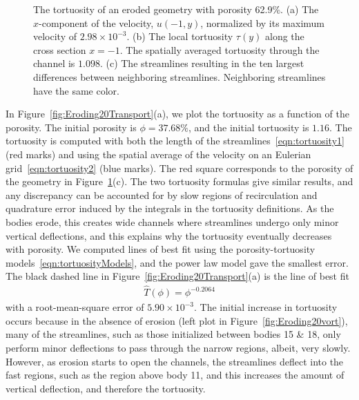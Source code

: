 \documentclass[preprint,10pt]{elsarticle}
\begin{document}
\begin{figure}[H]
\begin{subfigure}[b]{0.5\textwidth}
\caption{}
\end{subfigure}
\caption{\label{fig:Eroding20tort} The tortuosity of an eroded geometry
with porosity 62.9\%. (a) The $x$-component of the velocity, $u(-1,y)$,
normalized by its maximum velocity of $2.98 \times 10^{-3}$. (b) The
local tortuosity $\tau(y)$ along the cross section $x = -1$.  The
spatially averaged tortuosity through the channel is $1.098$.  (c) The
streamlines resulting in the ten largest differences between neighboring
streamlines.  Neighboring streamlines have the same color.}
\end{figure}

In Figure~\ref{fig:Eroding20Transport}(a), we plot the tortuosity as a
function of the porosity. The initial porosity is $\phi = 37.68\%$, and
the initial tortuosity is $1.16$.  The tortuosity is computed with both
the length of the streamlines~\eqref{eqn:tortuosity1} (red marks) and
using the spatial average of the velocity on an Eulerian
grid~\eqref{eqn:tortuosity2} (blue marks).  The red square corresponds
to the porosity of the geometry in Figure~\ref{fig:Eroding20tort}(c).
The two tortuosity formulas give similar results, and any discrepancy
can be accounted for by slow regions of recirculation and quadrature
error induced by the integrals in the tortuosity definitions.  As the
bodies erode, this creates wide channels where streamlines undergo only
minor vertical deflections, and this explains why the tortuosity
eventually decreases with porosity.  We computed lines of best fit using
the porosity-tortuosity models~\eqref{eqn:tortuosityModels}, and the
power law model gave the smallest error.  The  black dashed line in
Figure~\ref{fig:Eroding20Transport}(a) is the line of best fit
\begin{align}
  \widehat{T}(\phi) = \phi^{-0.2064}
\end{align}
with a root-mean-square error of $5.90 \times 10^{-3}$.  The initial
increase in tortuosity occurs because in the absence of erosion (left
plot in Figure~\ref{fig:Eroding20vort}), many of the streamlines, such
as those initialized between bodies 15 \& 18, only perform minor
deflections to pass through the narrow regions, albeit, very slowly.
However, as erosion starts to open the channels, the streamlines deflect
into the fast regions, such as the region above body 11, and this
increases the amount of vertical deflection, and therefore the
tortuosity.
\end{document}
